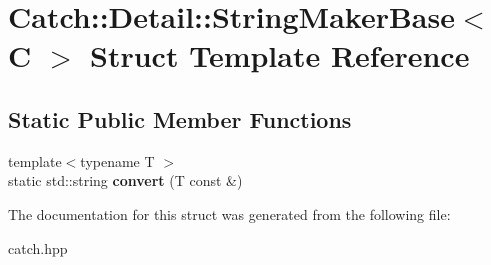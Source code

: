 \hypertarget{structCatch_1_1Detail_1_1StringMakerBase}{}\section{Catch\+:\+:Detail\+:\+:String\+Maker\+Base$<$ C $>$ Struct Template Reference}
\label{structCatch_1_1Detail_1_1StringMakerBase}
\subsection*{Static Public Member Functions}
\begin{DoxyCompactItemize}
\item 
\mbox{\label{structCatch_1_1Detail_1_1StringMakerBase_a8eb9f635dc413a5758e22614bafaf1a3}} 
{\footnotesize template$<$typename T $>$ }\\static std\+::string {\bfseries convert} (T const \&)
\end{DoxyCompactItemize}


The documentation for this struct was generated from the following file\+:\begin{DoxyCompactItemize}
\item 
catch.\+hpp\end{DoxyCompactItemize}
